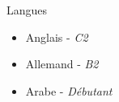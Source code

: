 \vspace{5mm}
\hspace*{-2mm}
{\fontsize{16}{10}\selectfont {} \hspace{1.5mm} Langues} \newline
\vspace{-5mm}
\begin{itemize}[noitemsep]
    \item[] Anglais - \textit{C2}
    \item[] Allemand - \textit{B2}
    \item[] Arabe - \textit{Débutant}
\end{itemize}